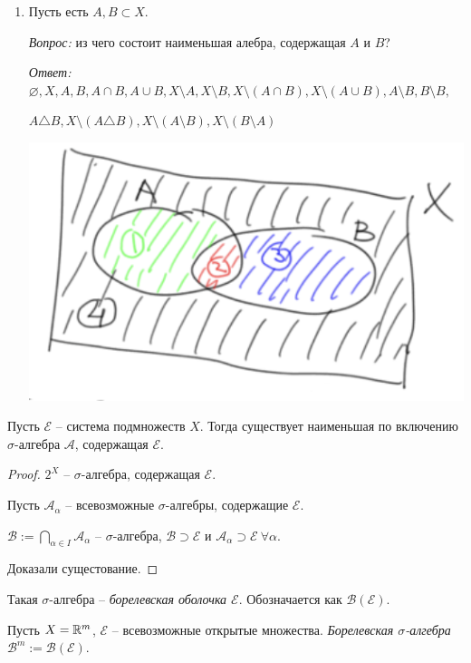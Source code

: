 \begin{example}
\begin{enumerate}
        \item Пусть есть $A, B\subset X$. 
        
        \textit{Вопрос:} из чего состоит наименьшая алебра, содержащая $A$ и $B$?
        
        \textit{Ответ:} $\varnothing, X, A, B, A\cap B, A \cup B, X \setminus A,  X \setminus B,  X \setminus (A\cap B),  X \setminus (A\cup B), A\setminus B, B\setminus B,$
        
        $A\triangle B, X \setminus (A\triangle B), X\setminus (A\setminus B), X\setminus (B\setminus A)$

        \includegraphics[width=0.3\linewidth]{images/23-09-07-2.png}
    \end{enumerate}
\end{example}

\begin{theorem}
    Пусть $\mathcal{E}$ – система подмножеств $X$. Тогда существует наименьшая по включению $\sigma$-алгебра $\mathcal{A}$,
    содержащая $\mathcal{E}$.
\end{theorem}

\begin{proof}
    $2^X$ – $\sigma$-алгебра, содержащая $\mathcal{E}$.

    Пусть $\mathcal{A}_\alpha$ – всевозможные $\sigma$-алгебры, содержащие $\mathcal{E}$.

    $\mathcal{B} :=\bigcap\limits_{\alpha \in I}\mathcal{A}_\alpha$ – $\sigma$-алгебра, $\mathcal{B} \supset \mathcal{E}$ и $\mathcal{A}_\alpha \supset \mathcal{E}\ \forall \alpha$.

    Доказали сущестование.
\end{proof}

\begin{definition}
    Такая $\sigma$-алгебра – \textit{борелевская оболочка $\mathcal{E}$}. Обозначается как $\mathcal{B}(\mathcal{E})$.
\end{definition}

\begin{definition}
    Пусть $X=\mathbb{R}^m$, $\mathcal{E}$ – всевозможные открытые множества. \textit{Борелевская $\sigma$-алгебра} $\mathcal{B}^m:=\mathcal{B}(\mathcal{E})$.
\end{definition}

